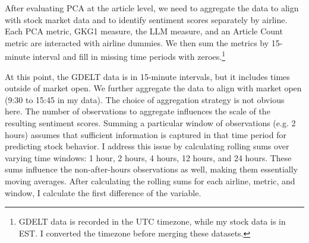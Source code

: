 \documentclass[12pt]{article}
\begin{document}
After evaluating PCA at the article level, we need to aggregate the data to align with stock market data and to identify sentiment scores separately by airline. Each PCA metric, GKG1 measure, the LLM measure, and an Article Count metric are interacted with airline dummies. We then sum the metrics by  15-minute interval and fill in missing time periods with zeroes.\footnote{GDELT data is recorded in the UTC timezone, while my stock data is in EST. I converted the timezone before merging these datasets.}

At this point, the GDELT data is in 15-minute intervals, but it includes times outside of market open. We further aggregate the data to align with market open (9:30 to 15:45 in my data). The choice of aggregation strategy is not obvious here. The number of observations to aggregate influences the scale of the resulting sentiment scores. Summing a particular window of observations (e.g. 2 hours) assumes that sufficient information is captured in that time period for predicting stock behavior. I address this issue by calculating rolling sums over varying time windows: 1 hour, 2 hours, 4 hours, 12 hours, and 24 hours. These sums influence the non-after-hours observations as well, making them essentially moving averages. After calculating the rolling sums for each airline, metric, and window, I calculate the first difference of the variable.
\end{document}
